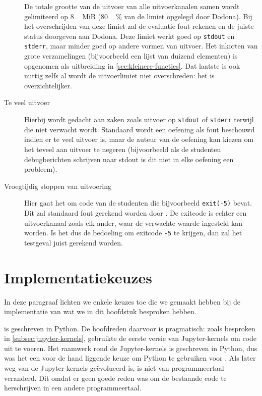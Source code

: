 \begin{description}
    De totale grootte van de uitvoer van alle uitvoerkanalen samen wordt gelimiteerd op \unit{8\,MiB} (\unit{80\,\%} van de limiet opgelegd door Dodona).
    Bij het overschrijden van deze limiet zal \tested{} de evaluatie fout rekenen en de juiste status doorgeven aan Dodona.
    Deze limiet werkt goed op \texttt{stdout} en \texttt{stderr}, maar minder goed op andere vormen van uitvoer.
    Het inkorten van grote verzamelingen (bijvoorbeeld een lijst van duizend elementen) is opgenomen als uitbreiding in \cref{sec:kleinere-functies}.
    Dat laatste is ook nuttig zelfs al wordt de uitvoerlimiet niet overschreden: het is overzichtelijker.
    \item[Te veel uitvoer] Hierbij wordt gedacht aan zaken zoals uitvoer op \texttt{stdout} of \texttt{stderr} terwijl die niet verwacht wordt.
    Standaard wordt een oefening als fout beschouwd indien er te veel uitvoer is, maar de auteur van de oefening kan kiezen om het teveel aan uitvoer te negeren (bijvoorbeeld als de studenten debugberichten schrijven naar stdout is dit niet in elke oefening een probleem).
    \item[Vroegtijdig stoppen van uitvoering] Hier gaat het om code van de studenten die bijvoorbeeld \texttt{exit(-5)} bevat.
    Dit zal standaard fout gerekend worden door \tested{}.
    De exitcode is echter een uitvoerkanaal zoals elk ander, waar de verwachte waarde ingesteld kan worden.
    Is het dus de bedoeling om exitcode \texttt{-5} te krijgen, dan zal het testgeval juist gerekend worden.

\end{description}

\section{Implementatiekeuzes}\label{sec:technische-aspecten}

In deze paragraaf lichten we enkele keuzes toe die we gemaakt hebben bij de implementatie van wat we in dit hoofdstuk besproken hebben.

\tested{} is geschreven in Python.
De hoofdreden daarvoor is pragmatisch: zoals besproken in \cref{subsec:jupyter-kernels}, gebruikte de eerste versie van \tested{} Jupyter-kernels om code uit te voeren.
Het raamwerk rond de Jupyter-kernels is geschreven in Python, dus was het een voor de hand liggende keuze om Python te gebruiken voor \tested{}.
Als \tested{} later weg van de Jupyter-kernels geëvolueerd is, is niet van programmeertaal veranderd.
Dit omdat er geen goede reden was om de bestaande code te herschrijven in een andere programmeertaal.

